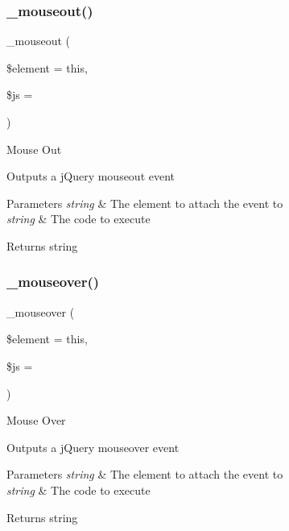 \subsubsection{\texorpdfstring{\+\_\+mouseout()}{\_mouseout()}}
{\footnotesize\ttfamily \+\_\+mouseout (\begin{DoxyParamCaption}\item[{}]{\$element = {\ttfamily \textquotesingle{}this\textquotesingle{}},  }\item[{}]{\$js = {\ttfamily \textquotesingle{}\textquotesingle{}} }\end{DoxyParamCaption})\hspace{0.3cm}{\ttfamily [protected]}}

Mouse Out

Outputs a j\+Query mouseout event


\begin{DoxyParams}{Parameters}
{\em string} & The element to attach the event to \\
\hline
{\em string} & The code to execute \\
\hline
\end{DoxyParams}
\begin{DoxyReturn}{Returns}
string 
\end{DoxyReturn}
\mbox{\label{class_c_i___jquery_abe38c17415cf07abb6de435525676dca}} 
\subsubsection{\texorpdfstring{\+\_\+mouseover()}{\_mouseover()}}
{\footnotesize\ttfamily \+\_\+mouseover (\begin{DoxyParamCaption}\item[{}]{\$element = {\ttfamily \textquotesingle{}this\textquotesingle{}},  }\item[{}]{\$js = {\ttfamily \textquotesingle{}\textquotesingle{}} }\end{DoxyParamCaption})\hspace{0.3cm}{\ttfamily [protected]}}

Mouse Over

Outputs a j\+Query mouseover event


\begin{DoxyParams}{Parameters}
{\em string} & The element to attach the event to \\
\hline
{\em string} & The code to execute \\
\hline
\end{DoxyParams}
\begin{DoxyReturn}{Returns}
string 
\end{DoxyReturn}
\mbox{\label{class_c_i___jquery_a78d654cce0aaa6de766809e56b727261}} 
